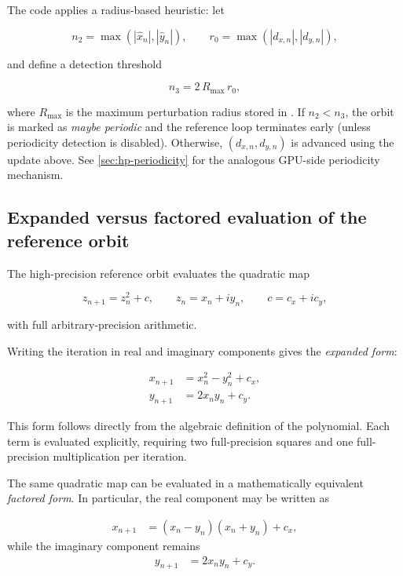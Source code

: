 The code applies a radius-based heuristic: let

\begin{equation}
  n_2 = \max(|\hat{x}_n|,|\hat{y}_n|),\qquad
  r_0 = \max(|d_{x,n}|,|d_{y,n}|),
\end{equation}

and define a detection threshold

\begin{equation}
  n_3 = 2\,R_{\max}\,r_0,
\end{equation}

where \(R_{\max}\) is the maximum perturbation radius stored in 
. If \(n_2 < n_3\), the orbit is marked as \emph{maybe periodic} and the
reference loop terminates early (unless periodicity detection is disabled).
Otherwise, \((d_{x,n},d_{y,n})\) is advanced using the update above.
See \cref{sec:hp-periodicity} for the analogous GPU-side periodicity mechanism.

\subsection{Expanded versus factored evaluation of the reference orbit}

The high-precision reference orbit evaluates the quadratic map

\[
z_{n+1} = z_n^2 + c,
\qquad
z_n = x_n + i y_n,
\qquad
c = c_x + i c_y,
\]

with full arbitrary-precision arithmetic.

Writing the iteration in real and imaginary components gives the
\emph{expanded form}:

\begin{align}
x_{n+1} &= x_n^2 - y_n^2 + c_x, \label{eq:ref-expanded-real} \\
y_{n+1} &= 2 x_n y_n + c_y. \label{eq:ref-expanded-imag}
\end{align}

This form follows directly from the algebraic definition of the polynomial.
Each term is evaluated explicitly, requiring two full-precision squares and
one full-precision multiplication per iteration.

The same quadratic map can be evaluated in a mathematically equivalent
\emph{factored form}. In particular, the real component may be written as

\begin{align}
x_{n+1}
&= (x_n - y_n)(x_n + y_n) + c_x, \label{eq:ref-factored-real}
\end{align}
while the imaginary component remains
\begin{align}
y_{n+1} &= 2 x_n y_n + c_y. \label{eq:ref-factored-imag}
\end{align}

